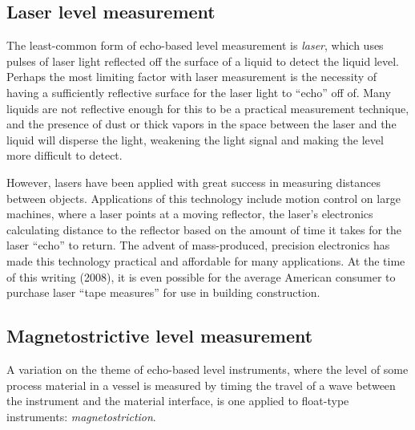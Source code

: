 \filbreak
\subsection{Laser level measurement}

The least-common form of echo-based level measurement is \textit{laser}, which uses pulses of laser light reflected off the surface of a liquid to detect the liquid level.  Perhaps the most limiting factor with laser measurement is the necessity of having a sufficiently reflective surface for the laser light to ``echo'' off of.  Many liquids are not reflective enough for this to be a practical measurement technique, and the presence of dust or thick vapors in the space between the laser and the liquid will disperse the light, weakening the light signal and making the level more difficult to detect.

However, lasers have been applied with great success in measuring distances between objects.  Applications of this technology include motion control on large machines, where a laser points at a moving reflector, the laser's electronics calculating distance to the reflector based on the amount of time it takes for the laser ``echo'' to return.  The advent of mass-produced, precision electronics has made this technology practical and affordable for many applications.  At the time of this writing (2008), it is even possible for the average American consumer to purchase laser ``tape measures'' for use in building construction.









\filbreak
\subsection{Magnetostrictive level measurement}

\label{magnetostrictive_level}

A variation on the theme of echo-based level instruments, where the level of some process material in a vessel is measured by timing the travel of a wave between the instrument and the material interface, is one applied to float-type instruments: \textit{magnetostriction}.  

